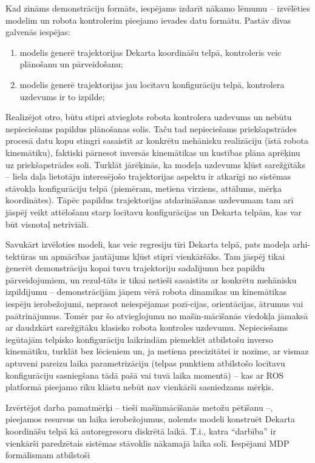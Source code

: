 \documentclass[12pt, a4paper]{article}
\numberwithin{equation}{section} %
\begin{document}
Kad zināms demonstrāciju formāts, iespējams izdarīt nākamo lēmumu -- izvēlēties modelim un robota kontrolerim pieejamo ievades datu formātu. Pastāv divas galvenās iespējas:

\begin{enumerate}
    \item modelis ģenerē trajektorijas Dekarta koordināšu telpā, kontroleris veic plānošanu un pārveidošanu;
    \item modelis ģenerē trajektorijas jau locītavu konfigurāciju telpā, kontrolera uzdevums ir to izpilde;
\end{enumerate}

Realizējot otro, būtu stipri atvieglots robota kontrolera uzdevums un nebūtu nepieciešams papildus plānošanas solis. Taču tad nepieciešams priekšapstrādes procesā datu kopu stingri sasaistīt ar konkrētu mehānisku realizāciju (īstā robota kinemātiku), faktiski pārnesot inversās kinemātikas un kustības plāna aprēķinu uz priekšapstrādes soli. Turklāt jārēķinās, ka modeļa uzdevums kļūst sarežģītāks -- liela daļa lietotāju interesējošo trajektorijas aspektu ir atkarīgi no sistēmas stāvokļa konfigurāciju telpā (piemēram, metiena virziens, attālums, mērķa koordinātes). Tāpēc papildus trajektorijas atdarināšanas uzdevumam tam arī jāspēj veikt attēlošanu starp locītavu konfigurācijas un Dekarta telpām, kas var būt visnotaļ netriviāli.  

Savukārt izvēloties modeli, kas veic regresiju tīri Dekarta telpā, pats modeļa arhi-tektūras un apmācības jautājums kļūst stipri vienkāršāks. Tam jāspēj tikai ģenerēt demonstrāciju kopai tuvu trajektoriju sadalījumu bez papildu pārveidojumiem, un rezul-tāts ir tikai netieši sasaistīts ar konkrētu mehānisku izpildījumu -- demonstrācijām jāņem vērā robota dinamikas un kinemātikas iespēju ierobežojumi, neprasot neiespējamas pozī-cijas, orientācijas, ātrumus vai paātrinājumus. Tomēr par šo atvieglojumu no mašīn-mācīšanās viedokļa jāmaksā ar daudzkārt sarežģītāku klasisko robota kontroles uzdevumu. Nepieciešams iegūtajām telpisko konfigurāciju laikrindām piemeklēt atbilstošu inverso kinemātiku, turklāt bez lēcieniem un, ja metiena precizitātei ir nozīme, ar vismaz aptuveni pareizu laika parametrizāciju (telpas punktiem atbilstošo locītavu konfigurāciju sasniegšana tādā pašā vai tuvā laika momentā) -- kas ar ROS platformā pieejamo rīku klāstu nebūt nav vienkārši sasniedzams mērķis.

Izvērtējot darba pamatmērķi -- tieši mašīnmācīšanās metožu pētīšanu --, pieejamos resursus un laika ierobežojumus, nolemts modeli konstruēt Dekarta koordināšu telpā kā autoregresoru diskrētā laikā. T.i., katra ``darbība'' ir vienkārši paredzētais sistēmas stāvoklis nākamajā laika solī. Iespējami MDP formālismam atbilstoši
\end{document}
